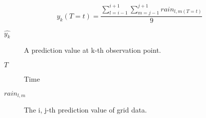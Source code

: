 \documentclass[fleqn]{article}
\begin{document}
\begin{equation}
  \widehat{y_k}(T = t) = \frac{\sum_{l=i-1}^{i+1} \sum_{m=j-1}^{j+1} rain_{l,m(T = t)}}{9}
\end{equation}
\begin{description}
  \item[$\widehat{y_k}$] A prediction value at k-th observation point.
  \item[$T$] Time
  \item[$rain_{l,m}$] The i, j-th prediction value of grid data.
\end{description}
\end{document}
